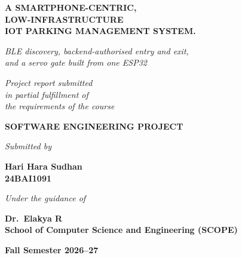 \documentclass[12pt,a4paper]{report}
\begin{document}
\begin{titlepage}
\centering
\thispagestyle{empty}

\reportlogo{\ImgLogo}

\vfill

{\Large\bfseries
A SMARTPHONE-CENTRIC, \\
LOW-INFRASTRUCTURE \\ IOT PARKING
MANAGEMENT SYSTEM.
\par}

\vspace{0.6cm}

{\large\itshape
BLE discovery, backend-authorised entry and exit, \\
and a servo gate built from one ESP32
\par}

\vfill

{\itshape
Project report submitted \\ in partial fulfillment of \\
the requirements of the course
\par}

\vspace{0.5cm}

{\large\bfseries
SOFTWARE ENGINEERING PROJECT
\par}

\vfill

{\itshape Submitted by\par}

\vspace{0.4cm}

{\bfseries
Hari Hara Sudhan \\
24BAI1091\\[4pt]
\par}

\vfill

{\itshape Under the guidance of\par}

\vspace{0.4cm}

{\bfseries
Dr.\ Elakya R\\
School of Computer Science and Engineering (SCOPE)
\par}

\vfill

{\bfseries
Fall Semester 2026--27
\par}

\end{titlepage}
\end{document}
